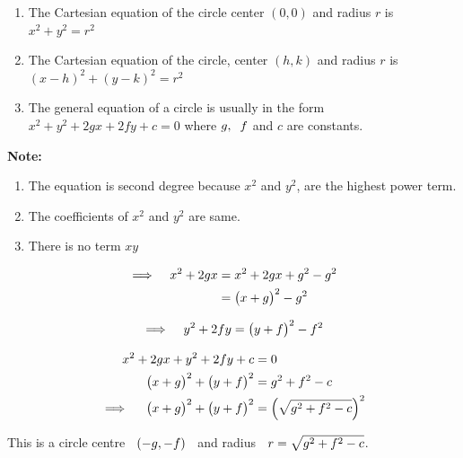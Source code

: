 \documentclass[11pt,a4paper]{article}
\begin{document}
\begin{enumerate}
\item[$*$] The Cartesian equation of the circle center $(0,0)$ and radius $r$ is \hspace{0.2cm}$x^2 + y^2 = r^2$

\item The Cartesian equation of the circle, center $(h,k)$ and radius $r$ is \hspace{0.2cm}$(x - h)^2 + (y - k)^2 = r^2$

\item The general equation of a circle is usually in the form \hspace{0.2cm}$x^2 + y^2 + 2gx + 2fy + c = 0$\hspace{0.2cm} where $g, \hspace{0.2cm} f$ and $c$ are constants.\\
\end{enumerate}






\textbf{Note:}
\begin{enumerate}
\item The equation is second degree because $x^2$ and $y^2$, are the highest power term.
\item The coefficients of $x^2$ and $y^2$ are same.
\item There is no term $xy$
\end{enumerate}




\begin{align*}
\implies\hspace{0.3cm} x^2 + 2gx & = x^2 + 2gx + g^2 - g^2\\
& = \big(x + g\big)^2 - g^2
\end{align*}


$$\implies\hspace{0.3cm} y^2 + 2fy = \big(y + f\big)^2 - f^2$$


\begin{align*}
x^2 + 2gx + y^2 + 2fy + c &  = 0\\
\big(x + g\big)^2 + \big(y + f\big)^2 & = g^2 + f^2 - c\\
\implies\hspace{0.4cm} \big(x + g\big)^2 + \big(y + f\big)^2 & = \Big( \sqrt{g^2 + f^2 - c}\Big)^2
\end{align*}


This is a circle centre $\hspace{0.2cm} (-g,-f)\hspace{0.2cm}$ and radius $\hspace{0.2cm} r = \sqrt{g^2 + f^2 - c}$.\\\\
\end{document}
